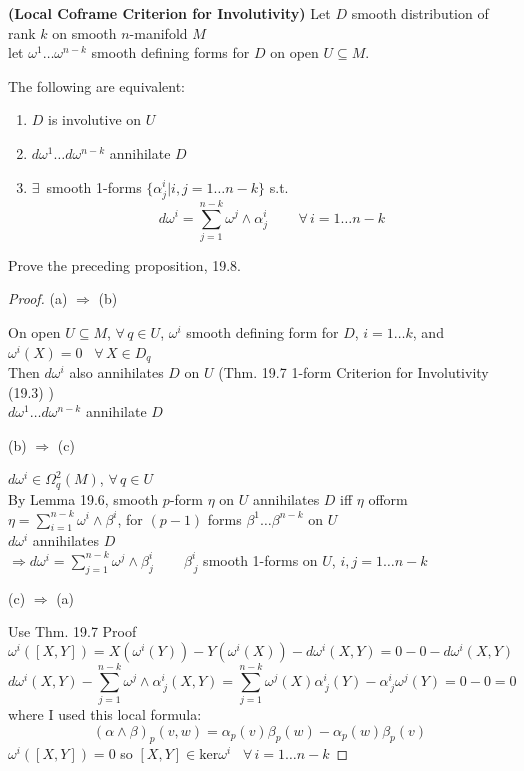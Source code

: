 \begin{proposition}[19.8] \textbf{(Local Coframe Criterion for Involutivity)}
  Let $D$ smooth distribution of rank $k$ on smooth $n$-manifold $M$ \\
let $\omega^1 \dots \omega^{n-k}$ smooth defining forms for $D$ on open $U \subseteq M$. 

The following are equivalent:
\begin{enumerate}
\item[(a)] $D$ is involutive on $U$ 
\item[(b)] $d\omega^1 \dots d\omega^{n-k}$ annihilate $D$
\item[(c)] $\exists \, $ smooth 1-forms $\lbrace \alpha^i_j | i, j =1 \dots n-k \rbrace$ s.t. 
\[
d\omega^i = \sum_{j=1}^{n-k} \omega^j \wedge \alpha^i_j \quad \quad \, \forall \, i = 1 \dots n-k
\]
\end{enumerate}
\end{proposition}

 Prove the preceding proposition, 19.8.  

\begin{proof}
(a) $\Longrightarrow$ (b) 

On open $U\subseteq M$, $\forall \, q \in U$, $\omega^i$ smooth defining form for $D$, $i=1\dots k$, and $\omega^i(X) = 0$ \, $\forall \, X \in D_q$  \\
\phantom{ On open } Then $d\omega^i$ also annihilates $D$ on $U$ (Thm. 19.7 1-form Criterion for Involutivity (19.3) ) \\
$d\omega^1 \dots d\omega^{n-k}$ annihilate $D$

(b) $\Longrightarrow $ (c)

$d\omega^i \in \Omega^2_q(M)$, $\forall \, q \in U$ \\
By Lemma 19.6, smooth $p$-form $\eta$ on $U$ annihilates $D$ iff $\eta$ ofform $\eta = \sum_{i=1}^{n-k} \omega^i\wedge \beta^i$, for $(p-1)$ forms $\beta^1 \dots \beta^{n-k}$ on $U$ \\
$d\omega^i$ annihilates $D$ \\
\phantom{\quad \, } $\Longrightarrow d\omega^i = \sum_{j=1}^{n-k} \omega^j \wedge \beta_j^i \quad \quad \, \beta^i_{ \, j} $ smooth 1-forms on $U$, $i,j=1\dots n-k$

(c) $\Longrightarrow $ (a) 

Use Thm. 19.7 Proof
\[
\omega^i([X,Y]) = X(\omega^i(Y)) - Y(\omega^i(X)) - d\omega^i(X,Y)  = 0 -0 - d\omega^i(X,Y)
\]
\[
d\omega^i(X,Y) - \sum_{j=1}^{n-k} \omega^j \wedge \alpha^i_{ \, j}(X,Y) = \sum_{j=1}^{n-k} \omega^j(X) \alpha^i_{ \, j }(Y) - \alpha^i_{ \, j}\omega^j(Y) = 0 - 0 = 0 
\]
where I used this local formula:
\[
(\alpha \wedge \beta)_p(v,w) = \alpha_p(v) \beta_p(w) - \alpha_p(w) \beta_p(v)
\]
$\omega^i([X,Y]) = 0$ so $[X,Y] \in \text{ker}\omega^i$ \quad \, $\forall \, i = 1 \dots n-k$

\end{proof}



